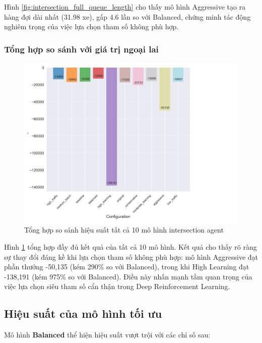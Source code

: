 Hình \ref{fig:intersection_full_queue_length} cho thấy mô hình Aggressive tạo ra
hàng đợi dài nhất (31.98 xe), gấp 4.6 lần so với Balanced, chứng minh tác động
nghiêm trọng của việc lựa chọn tham số không phù hợp.

\subsubsection{Tổng hợp so sánh với giá trị ngoại lai}

\begin{figure}[!htp]
    \centering
    \includegraphics[width=\textwidth]{
        figures/individual_plots/intersection_full_performance_summary.png
    }
    \caption{Tổng hợp so sánh hiệu suất tất cả 10 mô hình intersection agent}
    \label{fig:intersection_full_performance_summary}
\end{figure}

Hình \ref{fig:intersection_full_performance_summary} tổng hợp đầy đủ kết quả của tất cả 10 mô hình. Kết quả cho thấy rõ ràng sự thay đổi đáng kề khi lựa chọn tham số không phù hợp: mô hình Aggressive đạt phần thưởng -50,135 (kém 290\% so với Balanced), trong khi High Learning đạt -138,191 (kém 975\% so với Balanced). Điều này nhấn mạnh tầm quan trọng của việc lựa chọn siêu tham số cẩn thận trong Deep Reinforcement Learning.
\newpage
\subsection{Hiệu suất của mô hình tối ưu}

Mô hình \textbf{Balanced} thể hiện hiệu suất vượt trội với các chỉ số sau:

